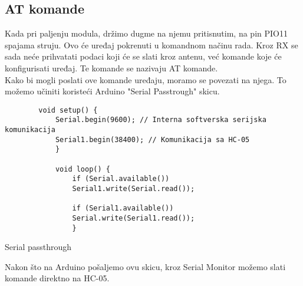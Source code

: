\documentclass[../Document.tex]{subfiles}
\begin{document}
\subsection{AT komande} \label{hcat}
Kada pri paljenju modula, držimo dugme na njemu pritisnutim, na pin PIO11 spajama struju. Ovo će uređaj pokrenuti u komandnom načinu rada. Kroz RX se sada neće prihvatati podaci koji će se slati kroz antenu, već komande koje će konfigurisati uređaj. Te komande se nazivaju AT komande.\\

Kako bi mogli poslati ove komande uređaju, moramo se povezati na njega. To možemo učiniti koristeći Arduino "Serial Passtrough" skicu.\\

\begin{code}
    \begin{verbatim}
        void setup() {
            Serial.begin(9600); // Interna softverska serijska komunikacija
            Serial1.begin(38400); // Komunikacija sa HC-05
            }
            
            void loop() {
                if (Serial.available())
                Serial1.write(Serial.read());
                
                if (Serial1.available())
                Serial.write(Serial1.read());
                }
            \end{verbatim}
    \caption{Serial passthrough}
\end{code}

Nakon što na Arduino pošaljemo ovu skicu, kroz Serial Monitor možemo slati komande direktno na HC-05.
\end{document}

